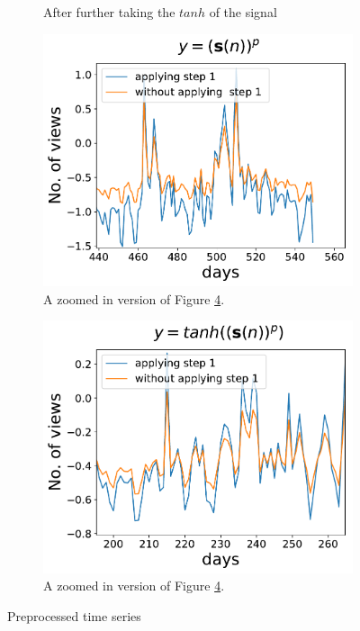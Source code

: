 \begin{figure}
\begin{subfigure}[h]{0.5\textwidth}
          \caption{After further taking the $tanh$ of the signal}
          \label{fig:compare_tanh}
      \end{subfigure} 
     \begin{subfigure}[h]{0.5\textwidth}
         \includegraphics[width=\textwidth]{./description/images/compare_zoom_squeezed}
         \caption{ A zoomed in version of Figure \ref{fig:preprocessing}.}
         \label{fig:compare_zoom_squeezed}
     \end{subfigure}
     \begin{subfigure}[h]{0.5\textwidth}
         \includegraphics[width=\textwidth]{./description/images/compare_zoom_tanh}
         \caption{A zoomed in version of Figure \ref{fig:preprocessing}.}
         \label{fig:compare_zoom_tanh}
     \end{subfigure}
      \caption{Preprocessed time series }\label{fig:preprocessing}
  \end{figure}
  
